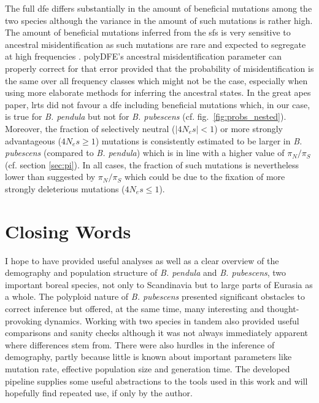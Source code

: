 \documentclass[hidelinks,11pt]{article}
\newcommand{\pendula}{\textit{B. pendula}}
\newcommand{\pubescens}{\textit{B. pubescens}}
\begin{document}
    The full \acrshort{dfe} differs substantially in the amount of beneficial mutations among the two species although the variance in the amount of such mutations is rather high. The amount of beneficial mutations inferred from the \acrshort{sfs} is very sensitive to ancestral misidentification as such mutations are rare and expected to segregate at high frequencies \cite{polydfe}. polyDFE's ancestral misidentification parameter can properly correct for that error provided that the probability of misidentification is the same over all frequency classes which might not be the case, especially when using more elaborate methods for inferring the ancestral states. In the great apes paper, \acrlong{lrt}s did not favour a \acrshort{dfe} including beneficial mutations which, in our case, is true for \pendula{} but not for \pubescens{} (cf. fig.~\ref{fig:probs_nested}). Moreover, the fraction of selectively neutral ($|4N_es| < 1$) or more strongly advantageous ($4N_es \geq 1$) mutations is consistently estimated to be larger in \pubescens{} (compared to \pendula{}) which is in line with a higher value of $\pi_N/\pi_S$ (cf. section \ref{sec:pi}). In all cases, the fraction of such mutations is nevertheless lower than suggested by $\pi_N/\pi_S$ which could be due to the fixation of more strongly deleterious mutations ($4N_es \leq 1$).

    \clearpage


    \section{Closing Words}

    I hope to have provided useful analyses as well as a clear overview of the demography and population structure of \pendula{} and \pubescens{}, two important boreal species, not only to Scandinavia but to large parts of Eurasia as a whole. The polyploid nature of \pubescens{} presented significant obstacles to correct inference but offered, at the same time, many interesting and thought-provoking dynamics. Working with two species in tandem also provided useful comparisons and sanity checks although it was not always immediately apparent where differences stem from. There were also hurdles in the inference of demography, partly because little is known about important parameters like mutation rate, effective population size and generation time. The developed pipeline supplies some useful abstractions to the tools used in this work and will hopefully find repeated use, if only by the author.
\end{document}

